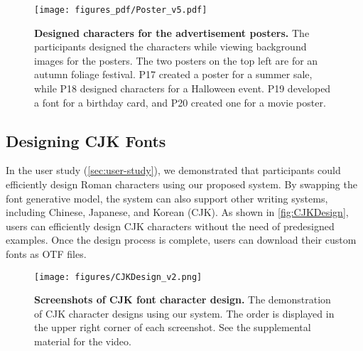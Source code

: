 \begin{figure}[t]
    \centering
    \texttt{[image: figures\_pdf/Poster\_v5.pdf]}
    \caption{
    \textbf{Designed characters for the advertisement posters.}
    The participants designed the characters while viewing background images for the posters.
    The two posters on the top left are for an autumn foliage festival.
    P17 created a poster for a summer sale, while P18 designed characters for a Halloween event.
    P19 developed a font for a birthday card, and P20 created one for a movie poster.
}
\label{fig:poster}
\end{figure}


\subsection{Designing CJK Fonts}
In the user study (\autoref{sec:user-study}), we demonstrated that participants could efficiently design Roman characters using our proposed system.
 By swapping the font generative model, the system can also support other writing systems, including Chinese, Japanese, and Korean (CJK).
As shown in \autoref{fig:CJKDesign}, users can efficiently design CJK characters without the need of predesigned examples.
Once the design process is complete, users can download their custom fonts as OTF files.




\begin{figure}[b]
    \centering
    \texttt{[image: figures/CJKDesign\_v2.png]}
    \caption{
    \textbf{Screenshots of CJK font character design.}
    The demonstration of CJK character designs using our system.
    The order is displayed in the upper right corner of each screenshot.
    See the supplemental material for the video.
}
\label{fig:CJKDesign}
\end{figure}
